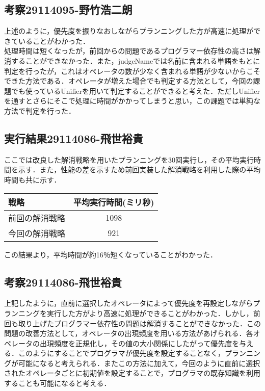 \documentclass{jarticle}
\begin{document}
\subsection{考察29114095-野竹浩二朗}
上述のように，優先度を振りなおしながらプランニングした方が高速に処理ができていることがわかった．\\
処理時間は短くなったが，前回からの問題であるプログラマー依存性の高さは解消することができなかった．また，judgeNameでは名前に含まれる単語をもとに判定を行ったが，これはオペレータの数が少なく含まれる単語が少ないからこそできた方法である．オペレータが増えた場合でも判定する方法として，今回の課題でも使っているUnifierを用いて判定することができると考えた．ただしUnifierを通すとさらにそこで処理に時間がかかってしまうと思い，この課題では単純な方法で判定を行った．
\subsection{実行結果29114086-飛世裕貴}
ここでは改良した解消戦略を用いたプランニングを30回実行し，その平均実行時間を示す．また，性能の差を示すため前回実装した解消戦略を利用した際の平均時間も共に示す．
\begin{table}[H]
\begin{center}
\begin{tabular}{|l|c|}
\hline
戦略 & 平均実行時間(ミリ秒) \\ 
\hline
前回の解消戦略 & 1098 \\ \hline
今回の解消戦略 & 921 \\ \hline
\end{tabular}
\end{center}
\end{table}
この結果より，平均時間が約16％短くなっていることがわかった．
\subsection{考察29114086-飛世裕貴}
上記したように，直前に選択したオペレータによって優先度を再設定しながらプランニングを実行した方がより高速に処理ができることがわかった．しかし，前回も取り上げたプログラマー依存性の問題は解消することができなかった．この問題の改善方法として，オペレータの出現頻度を用いる方法があげられる．各オペレータの出現頻度を正規化し，その値の大小関係にしたがって優先度を与える．このようにすることでプログラマが優先度を設定することなく，プランニングが可能になると考えられる．またこの方法に加えて，今回のように直前に選択されたオペレータごとに初期値を設定することで，プログラマの既存知識を利用することも可能になると考える．
\end{document}
